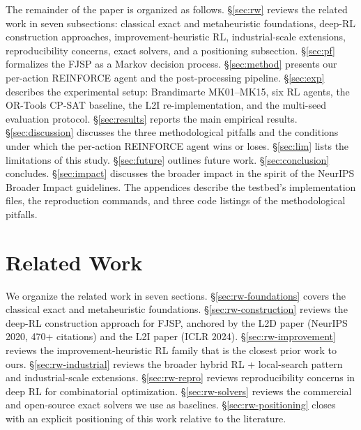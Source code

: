 \documentclass[10pt]{article}
\theoremstyle{definition}
\begin{document}
The remainder of the paper is organized as
follows.
\S\ref{sec:rw} reviews the related work in seven
subsections: classical exact and metaheuristic
foundations, deep-RL construction approaches,
improvement-heuristic RL, industrial-scale
extensions, reproducibility concerns, exact
solvers, and a positioning subsection.
\S\ref{sec:pf} formalizes the FJSP as a Markov
decision process.
\S\ref{sec:method} presents our per-action
REINFORCE agent and the post-processing
pipeline.
\S\ref{sec:exp} describes the experimental
setup: Brandimarte MK01--MK15, six RL agents,
the OR-Tools CP-SAT baseline, the L2I
re-implementation, and the multi-seed evaluation
protocol.
\S\ref{sec:results} reports the main empirical
results.
\S\ref{sec:discussion} discusses the three
methodological pitfalls and the conditions under
which the per-action REINFORCE agent wins or
loses.
\S\ref{sec:lim} lists the limitations of this
study.
\S\ref{sec:future} outlines future work.
\S\ref{sec:conclusion} concludes.
\S\ref{sec:impact} discusses the broader impact
in the spirit of the NeurIPS Broader Impact
guidelines.
The appendices describe the testbed's
implementation files, the reproduction commands,
and three code listings of the methodological
pitfalls.

\section{Related Work}

We organize the related work in seven sections.
\S\ref{sec:rw-foundations} covers the classical exact and
metaheuristic foundations.
\S\ref{sec:rw-construction} reviews the deep-RL construction
approach for FJSP, anchored by the L2D paper
\citep{Zhang2020L2D} (NeurIPS 2020, 470+ citations) and the L2I
paper \citep{Zhang2024L2I} (ICLR 2024).
\S\ref{sec:rw-improvement} reviews the improvement-heuristic RL
family that is the closest prior work to ours.
\S\ref{sec:rw-industrial} reviews the broader hybrid RL +
local-search pattern and industrial-scale extensions.
\S\ref{sec:rw-repro} reviews reproducibility concerns in deep RL
for combinatorial optimization.
\S\ref{sec:rw-solvers} reviews the commercial and open-source
exact solvers we use as baselines.
\S\ref{sec:rw-positioning} closes with an explicit positioning of
this work relative to the literature.

\end{document}
